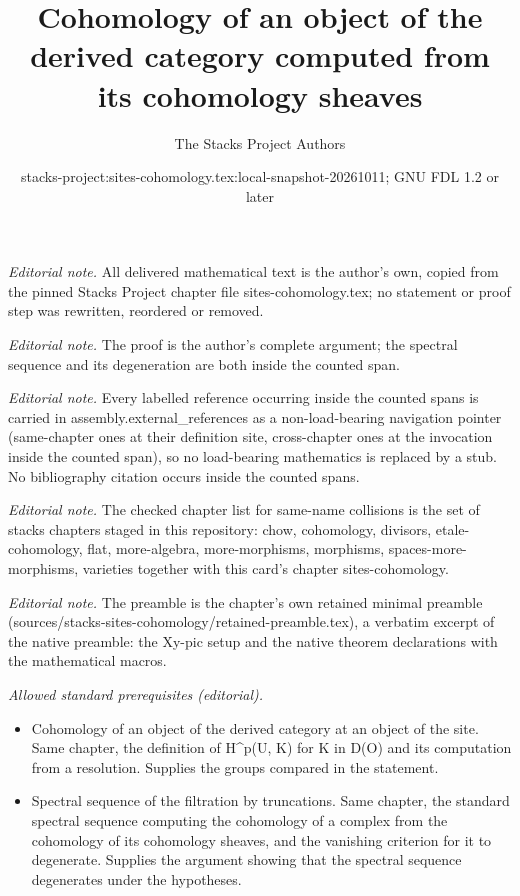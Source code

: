 \documentclass[10pt,a4paper]{amsart}
\title{Cohomology of an object of the derived category computed from its cohomology sheaves}
\author{The Stacks Project Authors}
\date{stacks-project:sites-cohomology.tex:local-snapshot-20261011; GNU FDL 1.2 or later}
\theoremstyle{plain}
\theoremstyle{definition}
\theoremstyle{remark}
\numberwithin{equation}{subsection}
\begin{document}
\maketitle
\noindent\textit{Editorial note.} All delivered mathematical text is the author's own, copied from the pinned Stacks Project chapter file sites-cohomology.tex; no statement or proof step was rewritten, reordered or removed.\par\medskip
\noindent\textit{Editorial note.} The proof is the author's complete argument; the spectral sequence and its degeneration are both inside the counted span.\par\medskip
\noindent\textit{Editorial note.} Every labelled reference occurring inside the counted spans is carried in assembly.external\_references as a non-load-bearing navigation pointer (same-chapter ones at their definition site, cross-chapter ones at the invocation inside the counted span), so no load-bearing mathematics is replaced by a stub. No bibliography citation occurs inside the counted spans.\par\medskip
\noindent\textit{Editorial note.} The checked chapter list for same-name collisions is the set of stacks chapters staged in this repository: chow, cohomology, divisors, etale-cohomology, flat, more-algebra, more-morphisms, morphisms, spaces-more-morphisms, varieties together with this card's chapter sites-cohomology.\par\medskip
\noindent\textit{Editorial note.} The preamble is the chapter's own retained minimal preamble (sources/stacks-sites-cohomology/retained-preamble.tex), a verbatim excerpt of the native preamble: the Xy-pic setup and the native theorem declarations with the mathematical macros.\par\medskip
\noindent\textit{Allowed standard prerequisites (editorial).}\begin{itemize}
\item Cohomology of an object of the derived category at an object of the site. Same chapter, the definition of H\textasciicircum{}p(U, K) for K in D(O) and its computation from a resolution. Supplies the groups compared in the statement.
\item Spectral sequence of the filtration by truncations. Same chapter, the standard spectral sequence computing the cohomology of a complex from the cohomology of its cohomology sheaves, and the vanishing criterion for it to degenerate. Supplies the argument showing that the spectral sequence degenerates under the hypotheses.
\end{itemize}\medskip
\end{document}
